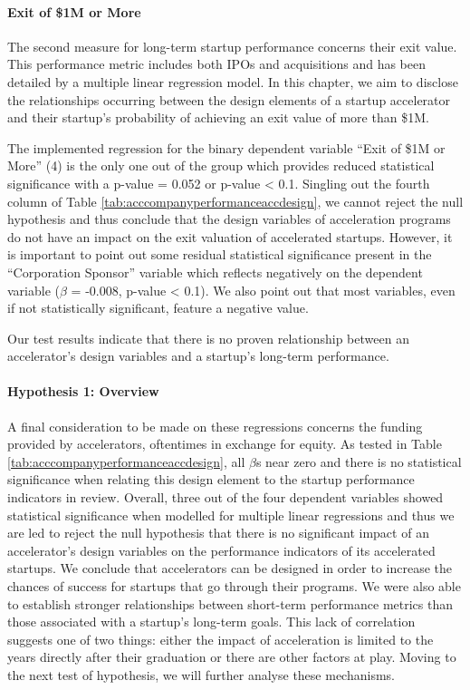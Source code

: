 \documentclass[
  12pt,
]{article}
\begin{document}
\hypertarget{exit-of-1m-or-more}{%
\paragraph{Exit of \$1M or More}\label{exit-of-1m-or-more}}

The second measure for long-term startup performance concerns their exit value. This performance metric includes both IPOs and acquisitions and has been detailed by a multiple linear regression model. In this chapter, we aim to disclose the relationships occurring between the design elements of a startup accelerator and their startup's probability of achieving an exit value of more than \$1M.

The implemented regression for the binary dependent variable ``Exit of \$1M or More'' (4) is the only one out of the group which provides reduced statistical significance with a p-value = 0.052 or p-value \textless{} 0.1. Singling out the fourth column of Table \ref{tab:acccompanyperformanceaccdesign}, we cannot reject the null hypothesis and thus conclude that the design variables of acceleration programs do not have an impact on the exit valuation of accelerated startups. However, it is important to point out some residual statistical significance present in the ``Corporation Sponsor'' variable which reflects negatively on the dependent variable (\(\beta\) = -0.008, p-value \textless{} 0.1). We also point out that most variables, even if not statistically significant, feature a negative value.

Our test results indicate that there is no proven relationship between an accelerator's design variables and a startup's long-term performance.

\hypertarget{hypothesis-1-overview}{%
\paragraph{Hypothesis 1: Overview}\label{hypothesis-1-overview}}

A final consideration to be made on these regressions concerns the funding provided by accelerators, oftentimes in exchange for equity. As tested in Table \ref{tab:acccompanyperformanceaccdesign}, all \(\beta\)s near zero and there is no statistical significance when relating this design element to the startup performance indicators in review. Overall, three out of the four dependent variables showed statistical significance when modelled for multiple linear regressions and thus we are led to reject the null hypothesis that there is no significant impact of an accelerator's design variables on the performance indicators of its accelerated startups. We conclude that accelerators can be designed in order to increase the chances of success for startups that go through their programs. We were also able to establish stronger relationships between short-term performance metrics than those associated with a startup's long-term goals. This lack of correlation suggests one of two things: either the impact of acceleration is limited to the years directly after their graduation or there are other factors at play. Moving to the next test of hypothesis, we will further analyse these mechanisms.
\end{document}
